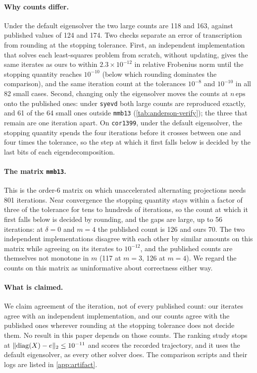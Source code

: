 \paragraph{Why counts differ.}
Under the default eigensolver the two large counts are 118 and 163, against
published values of 124 and 174. Two checks separate an error of transcription
from rounding at the stopping tolerance. First, an independent implementation
that solves each least-squares problem from scratch, without updating, gives
the same iterates as ours to within $2.3\times10^{-12}$ in relative Frobenius
norm until the stopping quantity reaches $10^{-10}$ (below which rounding
dominates the comparison), and the same iteration
count at the tolerances $10^{-8}$ and $10^{-10}$ in all 82 small cases. Second,
changing only the eigensolver moves the counts at $n\,\mathrm{eps}$ onto the
published ones: under \texttt{syevd} both large counts are reproduced exactly,
and 61 of the 64 small ones outside \texttt{mmb13} (\cref{tab:anderson-verify}); the three that remain are
one iteration apart. On \texttt{cor1399}, under the default eigensolver, the
stopping quantity spends the four iterations before it crosses between one
and four times the tolerance, so the step at which it first falls below is
decided by the last bits of each eigendecomposition.

\paragraph{The matrix \texttt{mmb13}.}
This is the order-6 matrix on which unaccelerated alternating projections needs
801 iterations. Near convergence the stopping quantity stays within a factor of
three of the tolerance for tens to hundreds of iterations, so the count at which
it first falls below is decided by rounding, and the gaps are large, up to 56
iterations: at $\delta=0$ and $m=4$ the published count is 126 and ours 70. The two
independent implementations disagree with each other by similar amounts on this
matrix while agreeing on its iterates to $10^{-12}$, and the published counts
are themselves not monotone in $m$ (117 at $m=3$, 126 at $m=4$). We regard the
counts on this matrix as uninformative about correctness either way.

\paragraph{What is claimed.}
We claim agreement of the iteration, not of every published count: our iterates
agree with an independent implementation, and our counts agree with the
published ones wherever rounding at the stopping tolerance does not decide
them. No result in this paper depends on those counts. The ranking study stops
at $\lVert \operatorname{diag}(X)-e\rVert_2\le10^{-11}$ and scores the recorded trajectory, and it
uses the default eigensolver, as every other solver does. The comparison
scripts and their logs are listed in \cref{app:artifact}.

